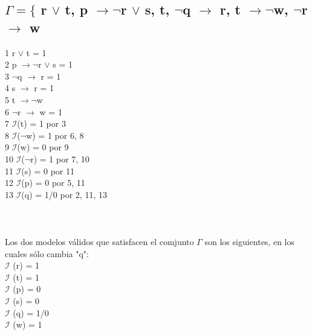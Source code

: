 \documentclass[11pt,letterpaper]{article}
\begin{document}
    \subsection{$\Gamma = \{$ r $\vee$ t, p $\rightarrow \neg$r $\vee$ s, t, $\neg$q $\rightarrow$ r, t $\rightarrow \neg$w, $\neg$r $\rightarrow$ w}
      \begin{multicols}{2}
        1 r $\vee$ t = 1 \\
        2 p $\rightarrow \neg$r $\vee$ s = 1 \\
        3 $\neg$q $\rightarrow$ r = 1 \\
        4 s $\rightarrow$ r = 1 \\
        5 t $\rightarrow \neg$w \\
        6 $\neg$r $\rightarrow$ w = 1 \\
        7 $\mathcal{I}$(t) = 1   \qquad por 3 \\
        8 $\mathcal{I}$($\neg$w) = 1   \qquad por 6, 8 \\
        9 $\mathcal{I}$(w) = 0   \qquad por 9 \\
        10 $\mathcal{I}$($\neg$r) = 1   \qquad por 7, 10 \\
        11 $\mathcal{I}$(s) = 0   \qquad por 11 \\
        12 $\mathcal{I}$(p) = 0   \qquad por 5, 11 \\
        13 $\mathcal{I}$(q) = 1/0   \qquad por 2, 11, 13 \\ \\ \\ \\
        Los dos modelos válidos que satisfacen el comjunto $\Gamma$ son los siguientes, en los cuales sólo cambia "q": \\
        $\mathcal{I}$ (r) = 1 \\
        $\mathcal{I}$ (t) = 1\\
        $\mathcal{I}$ (p) = 0\\
        $\mathcal{I}$ (s) = 0\\
        $\mathcal{I}$ (q) = 1/0\\
        $\mathcal{I}$ (w) = 1
      \end{multicols}
\end{document}
